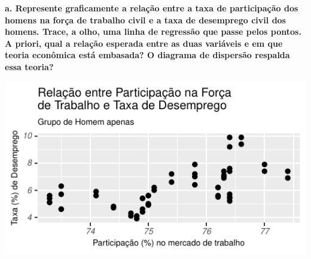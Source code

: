\documentclass[
  11pt,
  a4paper,
]{article}
\begin{document}
\begin{table}[H]

\caption{\label{tab:unnamed-chunk-11}Amostra do Dataset}
\centering
\fontsize{10}{12}\selectfont
{}
\end{table}

\textbf{a. Represente graficamente a relação entre a taxa de participação dos homens na força de trabalho civil e a taxa de desemprego civil dos homens. Trace, a olho, uma linha de regressão que passe pelos pontos. A priori, qual a relação esperada entre as duas variáveis e em que teoria econômica está embasada? O diagrama de dispersão respalda essa teoria?}

\begin{center}\includegraphics{article_files/figure-latex/unnamed-chunk-13-1} \end{center}
\end{document}
